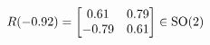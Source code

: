 \documentclass[preview]{standalone}
\begin{document}
\begin{align*}
\special{dvisvgm:raw <g id='unique000'>}R(-0.92) = \begin{bmatrix} 0.61 & 0.79 \\ -0.79 & 0.61 \end{bmatrix} \in \text{SO}(2)\special{dvisvgm:raw </g>}
\end{align*}
\end{document}
